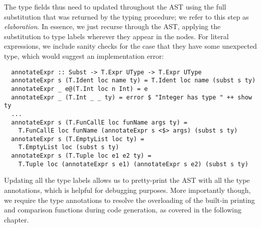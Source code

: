 The type fields thus need to updated throughout the AST using the full
substitution that was returned by the typing procedure; we refer to this step as
\emph{elaboration}.
In essence, we just recurse through the AST, applying the substitution to type
labels wherever they appear in the nodes.
For literal expressions, we include sanity checks for the case that they have
some unexpected type, which would suggest an implementation error:
\begin{verbatim}
  annotateExpr :: Subst -> T.Expr UType -> T.Expr UType
  annotateExpr s (T.Ident loc name ty) = T.Ident loc name (subst s ty)
  annotateExpr _ e@(T.Int loc n Int) = e
  annotateExpr _ (T.Int _ _ ty) = error $ "Integer has type " ++ show ty
  ...
  annotateExpr s (T.FunCallE loc funName args ty) =
    T.FunCallE loc funName (annotateExpr s <$> args) (subst s ty)
  annotateExpr s (T.EmptyList loc ty) =
    T.EmptyList loc (subst s ty)
  annotateExpr s (T.Tuple loc e1 e2 ty) =
    T.Tuple loc (annotateExpr s e1) (annotateExpr s e2) (subst s ty)
\end{verbatim}

Updating all the type labels allows us to pretty-print the AST with all the type
annotations, which is helpful for debugging purposes.
More importantly though, we require the type annotations to resolve the
overloading of the built-in printing and comparison functions during code
generation, as covered in the following chapter.
